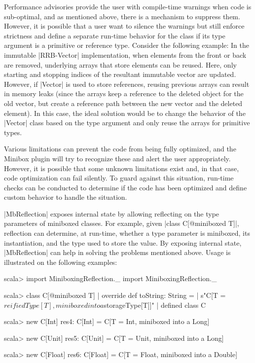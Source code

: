 Performance advisories provide the user with compile-time warnings when code is sub-optimal, and as mentioned above, there is a mechanism to suppress them. However, it is possible that a user want to silence the warnings but still enforce strictness and define a separate run-time behavior for the class if its type argument is a primitive or reference type. Consider the following example: In the immutable |RRB-Vector| implementation, when elements from the front or back are removed, underlying arrays that store elements can be reused. Here, only starting and stopping indices of the resultant immutable vector are updated. However, if |Vector| is used to store references, reusing previous arrays can result in memory leaks (since the arrays keep a reference to the deleted object for the old vector, but create a reference path between the new vector and the deleted element). In this case, the ideal solution would be to change the behavior of the |Vector| class based on the type argument and only reuse the arrays for primitive types.


Various limitations can prevent the code from being fully optimized, and the Minibox plugin will try to recognize these and alert the user appropriately. However, it is possible that some unknown limitations exist and, in that case, code optimization can fail silently. To guard against this situation, run-time checks can be conducted to determine if the code has been optimized and define custom behavior to handle the situation.


|MbReflection| exposes internal state by allowing reflecting on the type parameters of miniboxed classes. For example, given |class C[@miniboxed T]|, reflection can determine, at run-time, whether a type parameter is miniboxed, its instantiation, and the type used to store the value. By exposing internal state, |MbReflection| can help in solving the problems mentioned above. Usage is illustrated 	on the following examples:
\begin{lstlisting-nobreak}
scala> import MiniboxingReflection._
	import MiniboxingReflection._

scala> class C[@miniboxed T] {
    |   override def toString: String =
    |     s"C[T =${reifiedType[T]}, miniboxed into a ${storageType[T]}]"
    | }
	defined class C

scala> new C[Int]
	res4: C[Int] = C[T = Int, miniboxed into a Long]

scala> new C[Unit]
	res5: C[Unit] = C[T = Unit, miniboxed into a Long]

scala> new C[Float]
	res6: C[Float] = C[T = Float, miniboxed into a Double]
\end{lstlisting-nobreak}

